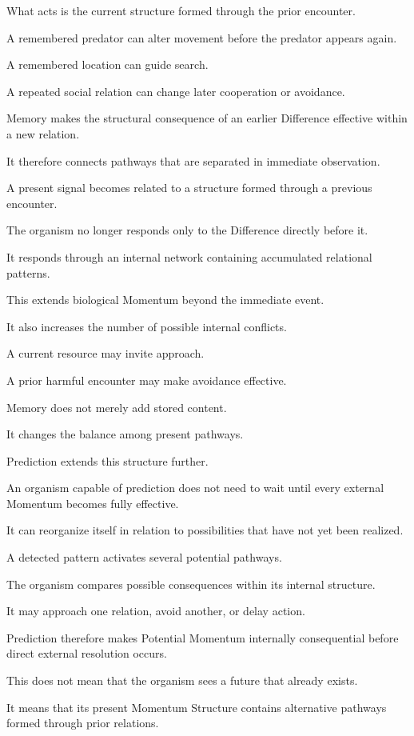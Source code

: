What acts is the current structure formed through the prior encounter.

A remembered predator can alter movement before the predator appears again.

A remembered location can guide search.

A repeated social relation can change later cooperation or avoidance.

Memory makes the structural consequence of an earlier Difference effective within a new relation.

It therefore connects pathways that are separated in immediate observation.

A present signal becomes related to a structure formed through a previous encounter.

The organism no longer responds only to the Difference directly before it.

It responds through an internal network containing accumulated relational patterns.

This extends biological Momentum beyond the immediate event.

It also increases the number of possible internal conflicts.

A current resource may invite approach.

A prior harmful encounter may make avoidance effective.

Memory does not merely add stored content.

It changes the balance among present pathways.

Prediction extends this structure further.

An organism capable of prediction does not need to wait until every external Momentum becomes fully effective.

It can reorganize itself in relation to possibilities that have not yet been realized.

A detected pattern activates several potential pathways.

The organism compares possible consequences within its internal structure.

It may approach one relation, avoid another, or delay action.

Prediction therefore makes Potential Momentum internally consequential before direct external resolution occurs.

This does not mean that the organism sees a future that already exists.

It means that its present Momentum Structure contains alternative pathways formed through prior relations.

